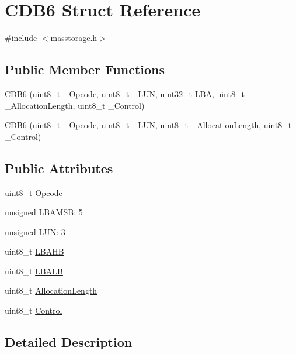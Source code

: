 \hypertarget{struct_c_d_b6}{\section{\-C\-D\-B6 \-Struct \-Reference}
\label{struct_c_d_b6}
}


{\ttfamily \#include $<$masstorage.\-h$>$}

\subsection*{\-Public \-Member \-Functions}
\begin{DoxyCompactItemize}
\item 
\hyperlink{struct_c_d_b6_ac68515ca26c4eabe62e63b5d722c3962}{\-C\-D\-B6} (uint8\-\_\-t \-\_\-\-Opcode, uint8\-\_\-t \-\_\-\-L\-U\-N, uint32\-\_\-t \-L\-B\-A, uint8\-\_\-t \-\_\-\-Allocation\-Length, uint8\-\_\-t \-\_\-\-Control)
\item 
\hyperlink{struct_c_d_b6_af878d394767d1278deacb11410b772f4}{\-C\-D\-B6} (uint8\-\_\-t \-\_\-\-Opcode, uint8\-\_\-t \-\_\-\-L\-U\-N, uint8\-\_\-t \-\_\-\-Allocation\-Length, uint8\-\_\-t \-\_\-\-Control)
\end{DoxyCompactItemize}
\subsection*{\-Public \-Attributes}
\begin{DoxyCompactItemize}
\item 
uint8\-\_\-t \hyperlink{struct_c_d_b6_af2b06ea02758f3096f48da306371a7d8}{\-Opcode}
\item 
unsigned \hyperlink{struct_c_d_b6_a1d5e2c34147b5ecc84d20f10e307fd1e}{\-L\-B\-A\-M\-S\-B}\-: 5
\item 
unsigned \hyperlink{struct_c_d_b6_ada1275c63867c75daf71348ec1f8d666}{\-L\-U\-N}\-: 3
\item 
uint8\-\_\-t \hyperlink{struct_c_d_b6_a6a0be8910a3e8039534b8570365a4207}{\-L\-B\-A\-H\-B}
\item 
uint8\-\_\-t \hyperlink{struct_c_d_b6_a28933fcb497ecd202ea07d665be57f9c}{\-L\-B\-A\-L\-B}
\item 
uint8\-\_\-t \hyperlink{struct_c_d_b6_a49d35d920a46db55bc300ee25f6065ef}{\-Allocation\-Length}
\item 
uint8\-\_\-t \hyperlink{struct_c_d_b6_a8629bc31675353132e17e5e37b3e0e41}{\-Control}
\end{DoxyCompactItemize}


\subsection{\-Detailed \-Description}


